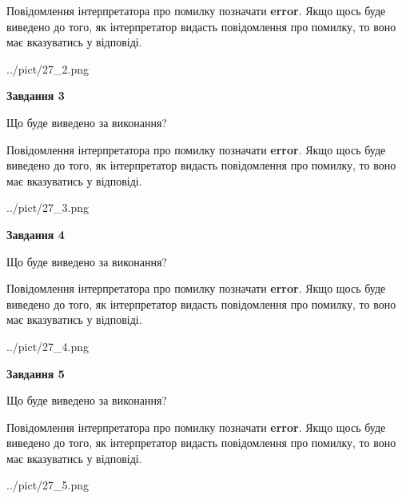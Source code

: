 \documentclass[12pt, ukrainian]{article}
\begin{document}
{\begin {large}
Повідомлення інтерпретатора про помилку позначати \textbf{error}.
Якщо щось буде виведено до того, як інтерпретатор видасть повідомлення про помилку, 
то воно має вказуватись у відповіді. \par


\begin{center}
	{../pict/27_2.png}
\end{center}
\newpage

{\begin {center}\textbf{Завдання 3}\end {center}}\par
Що буде виведено за виконання?

Повідомлення інтерпретатора про помилку позначати \textbf{error}.
Якщо щось буде виведено до того, як інтерпретатор видасть повідомлення про помилку, 
то воно має вказуватись у відповіді. \par


\begin{center}
	{../pict/27_3.png}
\end{center}
\newpage

{\begin {center}\textbf{Завдання 4}\end {center}}\par
Що буде виведено за виконання?

Повідомлення інтерпретатора про помилку позначати \textbf{error}.
Якщо щось буде виведено до того, як інтерпретатор видасть повідомлення про помилку, 
то воно має вказуватись у відповіді. \par


\begin{center}
	{../pict/27_4.png}
\end{center}
\newpage

{\begin {center}\textbf{Завдання 5}\end {center}}\par
Що буде виведено за виконання?

Повідомлення інтерпретатора про помилку позначати \textbf{error}.
Якщо щось буде виведено до того, як інтерпретатор видасть повідомлення про помилку, 
то воно має вказуватись у відповіді. \par


\begin{center}
	{../pict/27_5.png}
\end{center}
\newpage


\end{large}}
\end{document}
